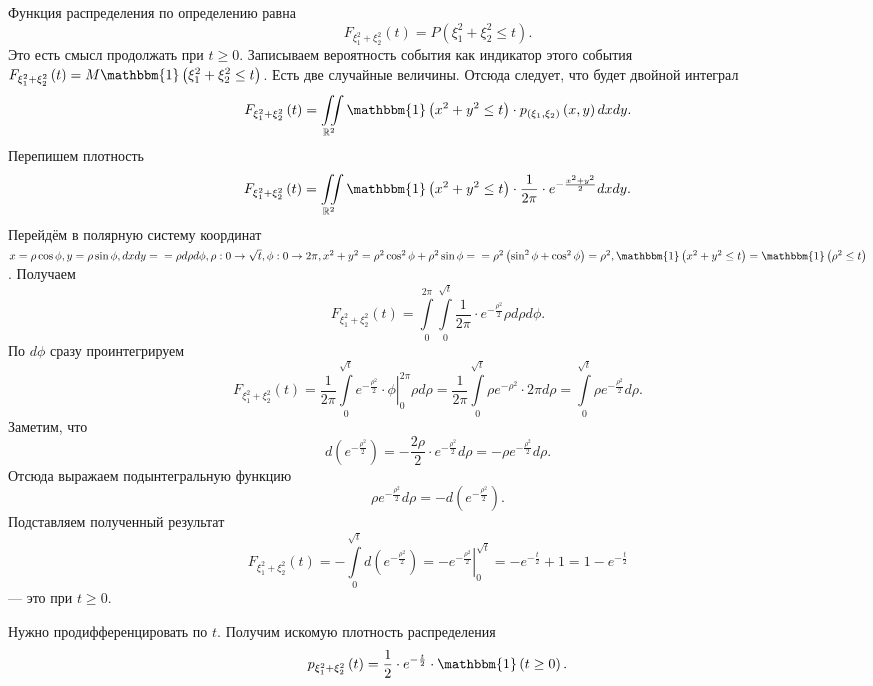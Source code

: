Функция распределения по определению равна
$$F_{ \xi_1^2 + \xi_2^2} \left( t \right) =
P \left( \xi_1^2 + \xi_2^2 \leq t \right).$$
Это есть смысл продолжать при $t \geq 0$.
Записываем вероятность события как индикатор этого события $F_{ \xi_1^2 + \xi_2^2} \left( t \right) = M \mathbbm{1} \left( \xi_1^2 + \xi_2^2 \leq t \right) $.
Есть две случайные величины.
Отсюда следует, что будет двойной интеграл
$$F_{ \xi_1^2 + \xi_2^2} \left( t \right) =
\iint \limits_{ \mathbb{R}^2} \mathbbm{1} \left( x^2 + y^2 \leq t \right) \cdot p_{ \left( \xi_1, \xi_2 \right) } \left( x, y \right) dxdy.$$
Перепишем плотность
$$F_{ \xi_1^2 + \xi_2^2} \left( t \right) =
\iint \limits_{ \mathbb{R}^2} \mathbbm{1} \left( x^2 + y^2 \leq t \right) \cdot \frac{1}{2 \pi } \cdot e^{- \frac{x^2 + y^2}{2}} dxdy.$$
Перейдём в полярную систему координат
$x = \rho \cos \phi,
y = \rho \sin \phi,
dxdy = \\
= \rho d \rho d \phi,
\rho: 0 \rightarrow \sqrt{t},
\phi: 0 \rightarrow 2 \pi,
x^2 + y^2 = \rho^2 \cos^2 \phi + \rho^2 \sin \phi = \\
= \rho^2 \left( \sin^2 \phi + \cos^2 \phi \right) = \rho^2,
\mathbbm{1} \left( x^2 + y^2 \leq t \right) = \mathbbm{1} \left( \rho^2 \leq t \right) $.
Получаем
$$F_{ \xi_1^2 + \xi_2^2} \left( t \right) =
\int \limits_0^{2 \pi } \int \limits_0^{ \sqrt{t}} \frac{1}{2 \pi } \cdot e^{- \frac{ \rho^2}{2}} \rho d \rho d \phi.$$
По $d \phi $ сразу проинтегрируем
$$F_{ \xi_1^2 + \xi_2^2} \left( t \right) =
\frac{1}{2 \pi } \int \limits_0^{ \sqrt{t}} \left. e^{- \frac{ \rho^2}{2}} \cdot \phi \right|_0^{2 \pi } \rho d \rho =
\frac{1}{2 \pi } \int \limits_0^{ \sqrt{t}} \rho e^{- \rho^2} \cdot 2 \pi d \rho =
\int \limits_0^{ \sqrt{t}} \rho e^{- \frac{ \rho^2}{2}} d \rho.$$
Заметим, что
$$d \left( e^{- \frac{ \rho^2}{2}} \right) =
- \frac{2 \rho }{2} \cdot e^{- \frac{ \rho^2}{2}} d \rho =
- \rho e^{- \frac{ \rho^2}{2}} d \rho.$$
Отсюда выражаем подынтегральную функцию
$$ \rho e^{- \frac{ \rho^2}{2}} d \rho =
-d \left( e^{- \frac{ \rho^2}{2}} \right) .$$
Подставляем полученный результат
$$F_{ \xi_1^2 + \xi_2^2} \left( t \right) =
- \int \limits_0^{ \sqrt{t}} d \left( e^{- \frac{ \rho^2}{2}} \right) =
\left. - e^{- \frac{ \rho^2}{2}} \right|_0^{ \sqrt{t}} =
-e^{- \frac{t}{2}} + 1 =
1 - e^{- \frac{t}{2}}$$
--- это при $t \geq 0$.

Нужно продифференцировать по $t$.
Получим искомую плотность распределения
$$p_{ \xi_1^2 + \xi_2^2} \left( t \right) =
\frac{1}{2} \cdot e^{- \frac{t}{2}} \cdot \mathbbm{1} \left( t \geq 0 \right).$$

